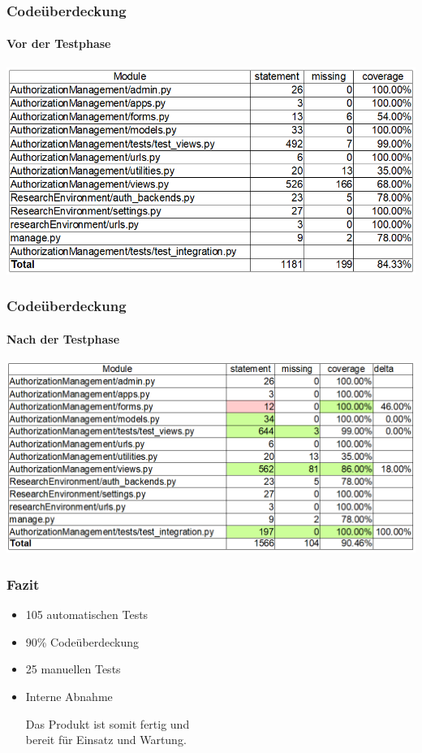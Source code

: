 \documentclass{beamer}
\begin{document}

\begin{frame}
\frametitle{Codeüberdeckung}
\framesubtitle{Vor der Testphase}
\begin{center}
\includegraphics[scale=0.6]{res/coverage_before.png}
\end{center}
\end{frame}


\begin{frame}
\frametitle{Codeüberdeckung}
\framesubtitle{Nach der Testphase}
\begin{center}
\includegraphics[scale=0.5]{res/coverage_after.png}
\end{center}
\end{frame}

\begin{frame}
\frametitle{Fazit}
	\begin{itemize}
		\item<1-4> 105 automatischen Tests
		\item<2-4> 90\% Codeüberdeckung
		\item<3-4> 25 manuellen Tests
		\item<4> Interne Abnahme\\
	
	\begin{center}
	Das Produkt ist somit fertig und \\bereit für Einsatz und Wartung.
	\end{center}
	
	\end{itemize}
\end{frame}
\end{document}
